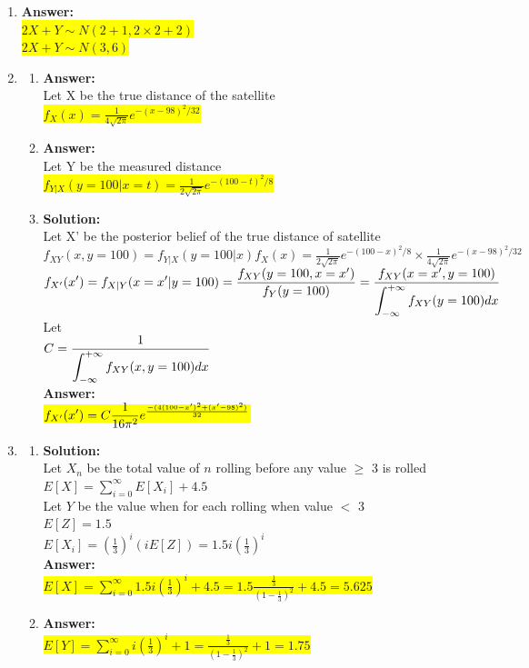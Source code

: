 \documentclass{article}
\newcommand{\myansw}{\textbf{Answer:}\\}
\newcommand{\mysolu}{\textbf{Solution:}\\}
\begin{document}
\begin{enumerate}
	\item 
	\myansw
	\colorbox{yellow}{${2X + Y \sim N(2+1, 2\times 2 + 2)}$}\\
	\colorbox{yellow}{${2X + Y \sim N(3, 6)}$}\\
	\item
	\begin{enumerate}
		\item 
		\myansw
		Let X be the true distance of the satellite\\
		\colorbox{yellow}{$f_X(x) = \frac{1}{4\sqrt{2\pi}}e^{-(x-98)^2/32}$}\\
		\item
		\myansw
		Let Y be the measured distance\\
		\colorbox{yellow}{$f_{Y|X}(y = 100|x = t) = \frac{1}{2\sqrt{2\pi}}e^{-(100-t)^2/8}$}\\
		\item
		\mysolu
		Let X' be the posterior belief of the true distance of satellite\\
		$f_{XY}(x, y = 100) =f_{Y|X}(y = 100|x )f_X(x)=\frac{1}{2\sqrt{2\pi}}e^{-(100-x)^2/8}\times \frac{1}{4\sqrt{2\pi}}e^{-(x-98)^2/32} $\\
		$\mathlarger{f_{X'}(x') = f_{X|Y}(x=x' | y = 100) = \frac{f_{XY}(y = 100, x=x')}{f_Y(y = 100)} = \frac{f_{XY}(x=x',y = 100)}{\mathlarger{\int_{-\infty}^{+\infty}f_{XY}(y = 100)dx}}}$\\
		Let\\
		$\mathlarger{C = \frac{1}{\mathlarger{\int_{-\infty}^{+\infty}f_{XY}(x,y = 100)dx}}}$\\
		\myansw
		\colorbox{yellow}{$\mathlarger{f_{X'}(x') = C\frac{1}{16\pi^2}e^{\frac{-(4(100-x')^2+(x'-98)^2)}{32}}}$}\\
	\end{enumerate}
	\item
	\begin{enumerate}
		\item
		\mysolu
		Let $X_n$ be the total value of $n$ rolling before any value $\geq$ 3 is rolled\\
		$E[X] = \sum\limits_{i = 0}^{\infty}E[X_i]+4.5$\\
		Let $Y$ be the value when for each rolling when value $<$ 3\\
		$E[Z] = 1.5$\\
		$E[X_i] = (\frac{1}{3})^i(iE[Z]) = 1.5i(\frac{1}{3})^i$\\
		\myansw
		\colorbox{yellow}{$E[X] = \sum\limits_{i = 0}^{\infty} 1.5i(\frac{1}{3})^i+4.5 = 1.5\frac{\frac{1}{3}}{(1-\frac{1}{3})^2}+4.5=5.625$}\\
		\item
		\myansw
		\colorbox{yellow}{$E[Y] = \sum\limits_{i = 0}^{\infty} i(\frac{1}{3})^i+1 = \frac{\frac{1}{3}}{(1-\frac{1}{3})^2}+1=1.75$}\\		
		

\end{enumerate}
\end{enumerate}
\end{document}
